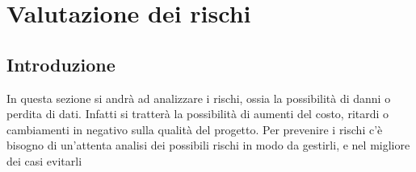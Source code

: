 \chapter{Valutazione dei rischi} 

\section{Introduzione}


In questa sezione si andrà ad analizzare i rischi, ossia la possibilità di danni o perdita di dati. Infatti si tratterà la possibilità di aumenti del costo, ritardi o cambiamenti in negativo sulla qualità del progetto. Per prevenire i rischi c’è bisogno di un’attenta analisi dei possibili rischi in modo da gestirli, e nel migliore dei casi evitarli